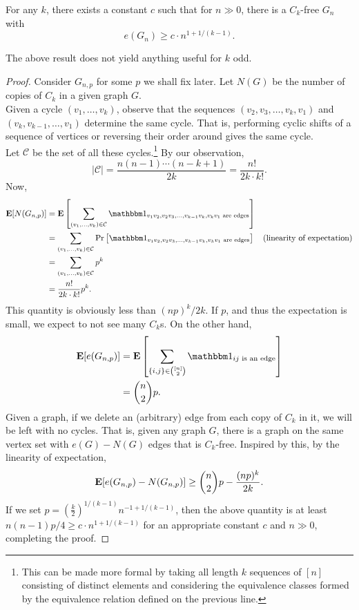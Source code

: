 
			\begin{ftheo}
				\label{theo: C_2k free}
				For any $k$, there exists a constant $c$ such that for $n \gg 0$, there is a $C_k$-free $G_n$ with
				\[ e(G_n) \geq c \cdot n^{1 + 1/(k-1)}. \]
			\end{ftheo}

			The above result does not yield anything useful for $k$ odd.

			\begin{proof}
				Consider $G_{n,p}$ for some $p$ we shall fix later. Let $N(G)$ be the number of copies of $C_k$ in a given graph $G$.\\
				Given a cycle $(v_1,\ldots,v_k)$, observe that the sequences $(v_2,v_3,\ldots,v_k, v_1)$ and $(v_k,v_{k-1},\ldots,v_1)$ determine the same cycle. That is, performing cyclic shifts of a sequence of vertices or reversing their order around gives the same cycle.\\
				Let $\mathcal{C}$ be the set of all these cycles.\footnote{This can be made more formal by taking all length $k$ sequences of $[n]$ consisting of distinct elements and considering the equivalence classes formed by the equivalence relation defined on the previous line.} By our observation,
				\[ |\mathcal{C}| = \frac{n(n-1)\cdots(n-k+1)}{2k} = \frac{n!}{2k\cdot k!}. \]
				Now,
				\begin{align*}
					\expec[N(G_{n,p})] &= \expec\left[ \sum_{(v_1,\ldots,v_k) \in \mathcal{C}} \indic_{v_1v_2, v_2v_3, \ldots, v_{k-1}v_k, v_kv_1\text{ are edges}} \right] \\ 
					&= \sum_{(v_1,\ldots,v_k) \in \mathcal{C}} \Pr\left[ \indic_{v_1v_2, v_2v_3, \ldots, v_{k-1}v_k, v_kv_1\text{ are edges}} \right] & \text{(linearity of expectation)} \\
					&= \sum_{(v_1,\ldots,v_k) \in \mathcal{C}} p^k \\
					&= \frac{n!}{2k \cdot k!} p^k.
				\end{align*}
				This quantity is obviously less than $(np)^k / 2k$. If $p$, and thus the expectation is small, we expect to not see many $C_k$s. On the other hand,
				\begin{align*}
					\expec[e(G_{n,p})] &= \expec \left[ \sum_{\{i,j\} \in \binom{[n]}{2}} \indic_{ij\text{ is an edge}} \right] \\
					&= \binom{n}{2} p.
				\end{align*}
				Given a graph, if we delete an (arbitrary) edge from each copy of $C_k$ in it, we will be left with no cycles. That is, given any graph $G$, there is a graph on the same vertex set with $e(G) - N(G)$ edges that is $C_k$-free. Inspired by this, by the linearity of expectation,
				\[ \textbf{E}[e(G_{n,p}) - N(G_{n,p})] \ge \binom{n}{2} p - \frac{(np)^k}{2k}. \]
				If we set $p = \left(\frac{k}{2}\right)^{1/(k-1)} n^{-1 + 1/(k-1)}$, then the above quantity is at least $n(n-1)p/4 \ge c \cdot n^{1 + 1/(k-1)}$ for an appropriate constant $c$ and $n\gg 0$, completing the proof.
			\end{proof}

